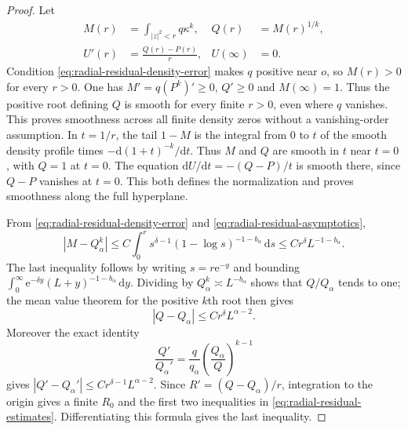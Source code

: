 \begin{proof}
Let
\begin{equation}\label{eq:radial-residual-inverse}
 \begin{aligned}
 M(r)&=\int_{|z|^2<r}q\kappa^k,& Q(r)&=M(r)^{1/k},\\
 U'(r)&=\frac{Q(r)-P(r)}r,& U(\infty)&=0.
 \end{aligned}
\end{equation}
Condition \eqref{eq:radial-residual-density-error} makes $q$ positive near $o$, so $M(r)>0$ for every
$r>0$. One has $M'=q(P^k)'\ge0$, $Q'\ge0$ and $M(\infty)=1$.
Thus the positive root defining $Q$ is smooth for every finite $r>0$,
even where $q$ vanishes. This proves smoothness across all finite density
zeros without a vanishing-order assumption.
In $t=1/r$, the tail $1-M$ is the integral from $0$ to $t$ of the smooth density profile times $-\mathrm{d}(1+t)^{-k}/\mathrm{d}t$. Thus $M$ and $Q$ are smooth in $t$ near $t=0$, with $Q=1$ at $t=0$. The equation
$\mathrm{d}U/\mathrm{d}t=-(Q-P)/t$ is smooth there, since $Q-P$ vanishes at
$t=0$. This both defines the normalization and proves smoothness
along the full hyperplane.

From \eqref{eq:radial-residual-density-error} and
\eqref{eq:radial-residual-asymptotics},
\begin{equation}\label{eq:radial-residual-tail}
 |M-Q_\alpha^k|
 \le C\int_0^r s^{\delta-1}(1-\log s)^{-1-b_\alpha}\,\mathrm{d}s
 \le Cr^\delta L^{-1-b_\alpha}.
\end{equation}
The last inequality follows by writing $s=r\mathrm{e}^{-y}$ and bounding
$\int_0^\infty \mathrm{e}^{-\delta y}(L+y)^{-1-b_\alpha}\,\mathrm{d}y$.
Dividing by $Q_\alpha^k\asymp L^{-b_\alpha}$ shows that $Q/Q_\alpha$
tends to one; the mean value theorem for the positive $k$th root
then gives
\begin{equation}\label{eq:radial-residual-flux-error}
 |Q-Q_\alpha|\le Cr^\delta L^{\alpha-2}.
\end{equation}
Moreover the exact identity
\[
 \frac{Q'}{Q_\alpha'}=
 \frac q{q_\alpha}\left(\frac{Q_\alpha}{Q}\right)^{k-1}
\]
gives $|Q'-Q_\alpha'|\le Cr^{\delta-1}L^{\alpha-2}$.
Since $R'=(Q-Q_\alpha)/r$, integration to the origin gives a finite
$R_0$ and the first two inequalities in \eqref{eq:radial-residual-estimates}.
Differentiating this formula gives the last inequality.


\end{proof}
